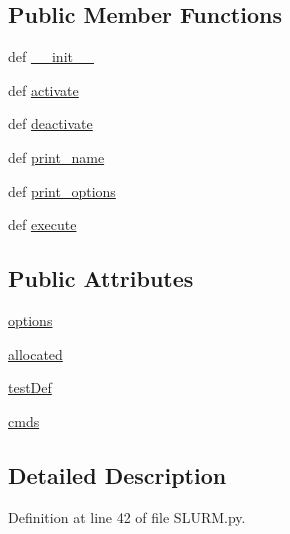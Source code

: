 \subsection*{Public Member Functions}
\begin{DoxyCompactItemize}
\item 
def \hyperlink{classSLURM_1_1SLURM_aa985bacce290322ef03060d671e705a1}{\-\_\-\-\_\-init\-\_\-\-\_\-}
\item 
def \hyperlink{classSLURM_1_1SLURM_a7b3b5d04275a853d623f6fff36b76e7e}{activate}
\item 
def \hyperlink{classSLURM_1_1SLURM_a4622d35bba26ef97a305e9d057e5db6c}{deactivate}
\item 
def \hyperlink{classSLURM_1_1SLURM_a79a9d29418a1a20a9d502c0723c3e8e7}{print\-\_\-name}
\item 
def \hyperlink{classSLURM_1_1SLURM_ad735f2669f29aca338d4dc61b6423284}{print\-\_\-options}
\item 
def \hyperlink{classSLURM_1_1SLURM_ab53b5b6093e23284f0f8494fc2be2263}{execute}
\end{DoxyCompactItemize}
\subsection*{Public Attributes}
\begin{DoxyCompactItemize}
\item 
\hyperlink{classSLURM_1_1SLURM_a652a43986b8bda5c6ddb866ab0513ac8}{options}
\item 
\hyperlink{classSLURM_1_1SLURM_aee4130d6ff2007d08fad045aedd69781}{allocated}
\item 
\hyperlink{classSLURM_1_1SLURM_a9b08ef79e039a8524f1fa6712b45182b}{test\-Def}
\item 
\hyperlink{classSLURM_1_1SLURM_ab755a940fd09c8fa416c177f692d31d6}{cmds}
\end{DoxyCompactItemize}


\subsection{Detailed Description}


Definition at line 42 of file S\-L\-U\-R\-M.\-py.



